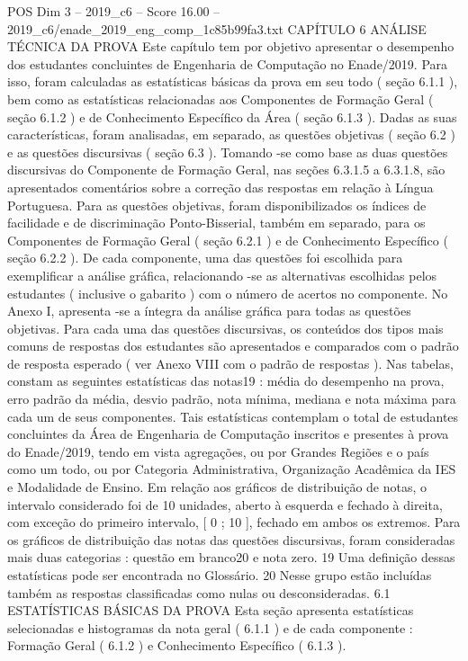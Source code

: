 \begin{textsample}{POS Dim 3 – 2019\_c6 – Score 16.00 – 2019\_c6/enade\_2019\_eng\_comp\_1c85b99fa3.txt}  \label{ex:f3_pos_013}
CAPÍTULO 6 ANÁLISE TÉCNICA DA PROVA Este capítulo tem por objetivo apresentar o desempenho dos estudantes concluintes de Engenharia de Computação no Enade/2019.
Para isso, foram calculadas as estatísticas básicas da prova em seu todo ( seção 6.1.1 ), bem como as estatísticas relacionadas aos Componentes de Formação Geral ( seção 6.1.2 ) e de Conhecimento Específico da Área ( seção 6.1.3 ).
Dadas as suas características, foram analisadas, em separado, as questões objetivas ( seção 6.2 ) e as questões discursivas ( seção 6.3 ).
Tomando -se como base as duas questões discursivas do Componente de Formação Geral, nas seções 6.3.1.5 a 6.3.1.8, são apresentados comentários sobre a correção das respostas em relação à Língua Portuguesa.
Para as questões objetivas, foram disponibilizados os índices de facilidade e de discriminação Ponto-Bisserial, também em separado, para os Componentes de Formação Geral ( seção 6.2.1 ) e de Conhecimento Específico ( seção 6.2.2 ).
De cada componente, uma das questões foi escolhida para exemplificar a análise gráfica, relacionando -se as alternativas escolhidas pelos estudantes ( inclusive o gabarito ) com o número de acertos no componente.
No Anexo I, apresenta -se a íntegra da análise gráfica para todas as questões objetivas.
Para cada uma das questões discursivas, os conteúdos dos tipos mais comuns de respostas dos estudantes são apresentados e comparados com o padrão de resposta esperado ( ver Anexo VIII com o padrão de respostas ).
Nas tabelas, constam as seguintes estatísticas das notas19 : média do desempenho na prova, erro padrão da média, desvio padrão, nota mínima, mediana e nota máxima para cada um de seus componentes.
Tais estatísticas contemplam o total de estudantes concluintes da Área de Engenharia de Computação inscritos e presentes à prova do Enade/2019, tendo em vista agregações, ou por Grandes Regiões e o país como um todo, ou por Categoria Administrativa, Organização Acadêmica da IES e Modalidade de Ensino.
Em relação aos gráficos de distribuição de notas, o intervalo considerado foi de 10 unidades, aberto à esquerda e fechado à direita, com exceção do primeiro intervalo, [ 0 ; 10 ], fechado em ambos os extremos.
Para os gráficos de distribuição das notas das questões discursivas, foram consideradas mais duas categorias : questão em branco20 e nota zero. 19 Uma definição dessas estatísticas pode ser encontrada no Glossário. 20 Nesse grupo estão incluídas também as respostas classificadas como nulas ou desconsideradas. 6.1 ESTATÍSTICAS BÁSICAS DA PROVA Esta seção apresenta estatísticas selecionadas e histogramas da nota geral ( 6.1.1 ) e de cada componente : Formação Geral ( 6.1.2 ) e Conhecimento Específico ( 6.1.3 ).

\end{textsample}
